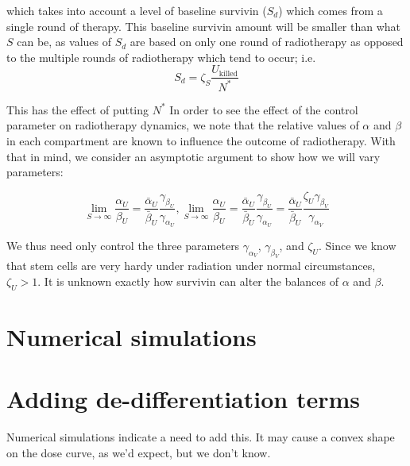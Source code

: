 \documentclass[12pt]{article}
\begin{document}
which takes into account a level of baseline survivin ($S_d$) which comes from a single round of therapy. This baseline survivin amount will be smaller than what $S$ can be, as values of $S_d$ are based on only one round of radiotherapy as opposed to the multiple rounds of radiotherapy which tend to occur; i.e. \[S_d = \zeta_S \frac{U_{\text{killed}}}{N^*} \]

This has the effect of putting $N^*$ In order to see the effect of the control parameter on radiotherapy dynamics, we note that the relative values of $\alpha$ and $\beta$ in each compartment are known to influence the outcome of radiotherapy. With that in mind, we consider an asymptotic argument to show how we will vary parameters:

\[\lim_{S\rightarrow\infty} \frac{\alpha_U}{\beta_U} = \frac{\bar{\alpha}_U}{\bar{\beta}_U}\frac{\gamma_{\beta_U}}{\gamma_{\alpha_U}},\lim_{S\rightarrow\infty} \frac{\alpha_U}{\beta_U} = \frac{\bar{\alpha}_U}{\bar{\beta}_U}\frac{\gamma_{\beta_U}}{\gamma_{\alpha_U}} = \frac{\bar{\alpha}_U}{\bar{\beta}_U}\frac{\zeta_U \gamma_{\beta_V}}{\gamma_{\alpha_V}}\] 

We thus need only control the three parameters $\gamma_{\alpha_V}$, $\gamma_{\beta_V}$, and $\zeta_U$. Since we know that stem cells are very hardy under radiation under normal circumstances, $\zeta_U>1$. It is unknown exactly how survivin can alter the balances of $\alpha$ and $\beta$.
\section*{Numerical simulations}

\section*{Adding de-differentiation terms}
Numerical simulations indicate a need to add this. It may cause a convex shape on the dose curve, as we'd expect, but we don't know.
\end{document}
